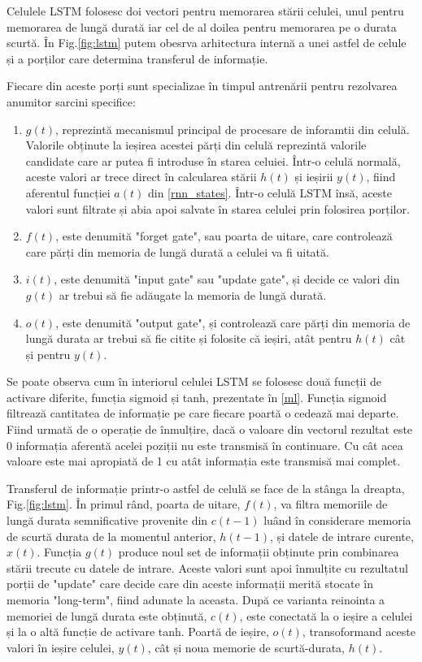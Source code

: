 \documentclass[a4paper,12pt]{book}
\begin{document}
				Celulele LSTM folosesc doi vectori pentru memorarea stării celulei, unul pentru memorarea de lungă durată iar cel de al doilea pentru memorarea pe o durata scurtă. În Fig.\ref{fig:lstm} putem obesrva arhitectura internă a unei astfel de celule și a porților care determina transferul de informație. \par
				Fiecare din aceste porți sunt specializae în timpul antrenării pentru rezolvarea anumitor sarcini specifice:
				\begin{enumerate}
					\item $g(t)$, reprezintă mecanismul principal de procesare de inforamtii din celulă. Valorile obținute la ieșirea acestei părți din celulă reprezintă valorile candidate care ar putea fi introduse în starea celuiei.  Într-o celulă normală, aceste valori ar trece direct în calcularea stării $h(t)$ și ieșirii $y(t)$, fiind aferentul funcției $a(t)$ din \ref{rnn_states}. Într-o celulă LSTM însă, aceste valori sunt filtrate și abia apoi salvate în starea celulei prin folosirea porților.
					\item $f(t)$, este denumită "forget gate", sau poarta de uitare, care controlează care părți din memoria de lungă durată a celulei va fi uitată.
					\item $i(t)$, este denumită "input gate" sau "update gate", și decide ce valori din $g(t)$ ar trebui să fie adăugate la memoria de lungă durată.
					\item $o(t)$, este denumită "output gate", și controlează care părți din memoria de lungă durata ar trebui să fie citite și folosite că ieșiri, atât pentru $h(t)$ cât și pentru $y(t)$. 
				\end{enumerate}
				Se poate observa cum în interiorul celulei LSTM se folosesc două funcții de activare diferite, funcția sigmoid și tanh, prezentate în \ref{ml}. Funcția sigmoid filtrează cantitatea de informație pe care fiecare poartă o cedează mai departe. Fiind urmată de o operație de înmulțire, dacă o valoare din vectorul rezultat este 0 informația aferentă acelei poziții nu este transmisă în continuare. Cu cât acea valoare este mai apropiată de 1 cu atât informația este transmisă mai complet. \par
				Transferul de informație printr-o astfel de celulă se face de la stânga la dreapta, Fig.\ref{fig:lstm}. În primul rând, poarta de uitare, $f(t)$, va filtra memoriile de lungă durata semnificative provenite din $c(t-1)$ luând în considerare memoria de scurtă durata de la momentul anterior, $h(t-1)$, și datele de intrare curente, $x(t)$. Funcția $g(t)$ produce noul set de informații obținute prin combinarea stării trecute cu datele de intrare. Aceste valori sunt apoi înmulțite cu rezultatul porții de "update" care decide care din aceste informații merită stocate în memoria "long-term", fiind adunate la aceasta. După ce varianta reinointa a memoriei de lungă durata este obținută, $c(t)$, este conectată la o ieșire a celulei și la o altă funcție de activare tanh. Poartă de ieșire, $o(t)$, transoformand aceste valori în ieșire celulei, $y(t)$, cât și noua memorie de scurtă-durata, $h(t)$. \par
\end{document}
